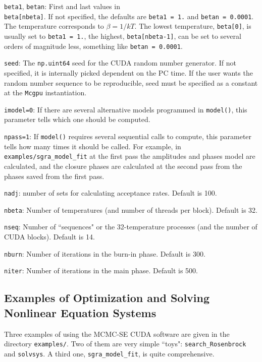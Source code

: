 \documentclass[preprint2]{aastex}
\begin{document}
\verb|beta1|, \verb|betan|: First and last values in \\
			\verb|beta[nbeta]|. If not specified,
			the defaults are \verb|beta1 = 1.| and \verb|betan = 0.0001|. 
			The temperature corresponds to $\beta = 1/{kT}$.
	        The lowest temperature, \verb|beta[0]|, is usually set to \verb|beta1 = 1.|, 
	        the highest, \verb|beta[nbeta-1]|, can be set to several orders of 
	        magnitude less, something like \verb|betan = 0.0001|.

\verb|seed|: The \verb|np.uint64| seed for the CUDA random number generator. If
			 not specified, it is internally picked dependent on the PC time.
			 If the user wants the random number sequence to be reproducible,
			 seed must be specified as a constant at the \verb|Mcgpu| 
			 instantiation.

\verb|imodel=0|: If there are several alternative models programmed in \verb|model()|,
 				  this parameter tells which one should be computed.
 				  
\verb|npass=1|: If \verb|model()| requires several sequential calls to compute,
				this parameter tells how many times it should be called. For
				example, in \verb|examples/sgra_model_fit| at the first pass
				the amplitudes and phases model are calculated, and the closure
				phases are calculated at the second pass from the phases saved
				from the first pass.

\verb|nadj|: number of sets for calculating acceptance rates. Default is 100.

\verb|nbeta|: Number of temperatures (and number of threads per block). 
			  Default is 32.

\verb|nseq|: Number of ``sequences" or the 32-temperature processes (and the 
			 number of CUDA blocks). Default is 14.

\verb|nburn|: Number of iterations in the burn-in phase. Default is 300.

\verb|niter|: Number of iterations in the main phase. Default is 500.



\subsection{Examples of Optimization and Solving Nonlinear Equation Systems}

Three examples of using the MCMC-SE CUDA software are given in the directory 
\verb|examples/|. Two of them are very simple ``toys": \verb|search_Rosenbrock|
and \verb|solvsys|. A third one, \verb|sgra_model_fit|, is quite comprehensive.
\end{document}
